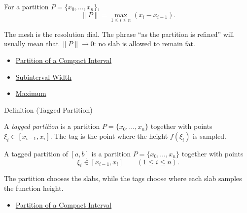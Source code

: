 \begin{remark*}
For a partition \(P=\{x_0,\ldots,x_n\}\),
\[
  \|P\|=\max_{1\le i\le n}(x_i-x_{i-1}).
\]
\end{remark*}

\begin{remark*}[Interpretation]
The mesh is the resolution dial. The phrase ``as the partition is refined''
will usually mean that \(\|P\|\to 0\): no slab is allowed to remain fat.
\end{remark*}

\begin{dependencies}
\begin{itemize}
  \item \hyperref[def:integration-partition]{Partition of a Compact Interval}
  \item \hyperref[def:subinterval-width-integration]{Subinterval Width}
  \item \hyperref[def:maximum]{Maximum}
\end{itemize}
\end{dependencies}

\begin{definitionbox}{Definition (Tagged Partition)}
\begin{definition}
\label{def:tagged-partition-integration}
A \emph{tagged partition} is a partition \(P=\{x_0,\ldots,x_n\}\) together
with points \(\xi_i\in[x_{i-1},x_i]\). The tag is the point where the height
\(f(\xi_i)\) is sampled.
\end{definition}
\end{definitionbox}

\begin{remark*}
A tagged partition of \([a,b]\) is a partition
\(P=\{x_0,\ldots,x_n\}\) together with points
\[
  \xi_i\in[x_{i-1},x_i]\qquad(1\le i\le n).
\]
\end{remark*}

\begin{remark*}[Interpretation]
The partition chooses the slabs, while the tags choose where each slab samples
the function height.
\end{remark*}

\begin{dependencies}
\begin{itemize}
  \item \hyperref[def:integration-partition]{Partition of a Compact Interval}
\end{itemize}
\end{dependencies}

